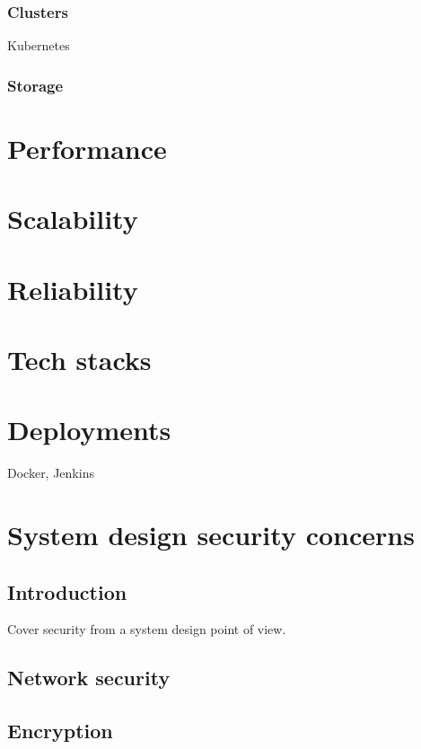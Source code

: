 \documentclass[a4paper, 11pt]{book}
\begin{document}
    \subsection{Clusters}
    Kubernetes

    \subsection{Storage}


    \chapter{Performance}


    \chapter{Scalability}


    \chapter{Reliability}


    \chapter{Tech stacks}


    \chapter{Deployments}
    Docker, Jenkins


    \chapter{System design security concerns}


    \section{Introduction}
    Cover security from a system design point of view.


    \section{Network security}


    \section{Encryption}
\end{document}
